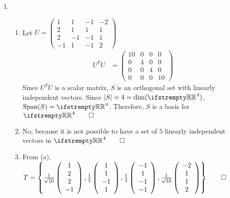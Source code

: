 \documentclass[12pt, a4paper]{article}
\begin{document}
\begin{enumerate}[Q\arabic*.]
  \pagebreak
  \item 
    \begin{enumerate}[(\alph*)]
      \item Let $U = \left(\begin{array}{cccc} 1 & 1 & -1 & -2\\ 2 & 1 & 1 & 1\\ 2 & -1 & -1 & 1\\ -1 & 1 & -1 & 2 \end{array}\right)$
        \begin{align*}
          U^TU &= \left(\begin{array}{cccc} 10 & 0 & 0 & 0\\ 0 & 4 & 0 & 0\\ 0 & 0 & 4 & 0\\ 0 & 0 & 0 & 10 \end{array}\right)
        \end{align*}
        Since $U^TU$ is a scalar matrix, $S$ is an orthogonal set with linearly independent vectors. Since $|S| = 4 = \dim(\RR^4)$, $\Span(S) = \RR^4$. Therefore, $S$ is a basis for $\RR^4 \qed$

      \item No; because it is not possible to have a set of $5$ linearly independent vectors in $\RR^4 \qed$

      \item From (a), $T = \left\{\frac{1}{\sqrt{10}}\left(\begin{array}{c} 1\\ 2\\ 2\\ -1 \end{array}\right), \frac{1}{2}\left(\begin{array}{c} 1\\ 1\\ -1\\ 1 \end{array}\right), \frac{1}{2}\left(\begin{array}{c} -1\\ 1\\ -1\\ -1 \end{array}\right), \frac{1}{\sqrt{10}}\left(\begin{array}{c} -2\\ 1\\ 1\\ 2 \end{array}\right)\right\} \qed$


\end{enumerate}
\end{enumerate}
\end{document}
